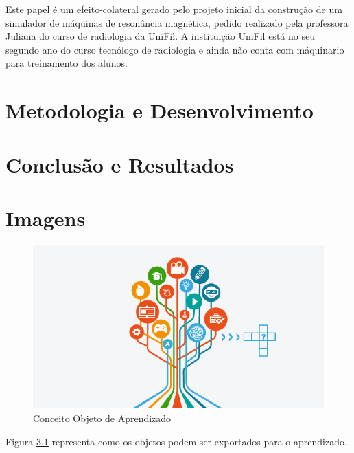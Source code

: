 \documentclass[12pt,openright,oneside,a4paper,english,french,spanish,brazil]{unifil}
\begin{document}
Este papel é um efeito-colateral gerado pelo projeto inicial da construção de um simulador de máquinas de resonância magnética, pedido realizado pela professora Juliana do curso de radiologia da UniFil. A instituição UniFil está no seu segundo ano do curso tecnólogo de radiologia e ainda não conta com máquinario para treinamento dos alunos.

\chapter {Metodologia e Desenvolvimento}

\chapter {Conclusão e Resultados}

\chapter {Imagens}
\begin{figure}[htb]
	\centering
	\includegraphics[scale=0.5]{arvore.png}
	\caption{Conceito Objeto de Aprendizado}
	\label{img:arvore}
\end{figure}
Figura \ref{img:arvore} representa como os objetos podem ser exportados para o aprendizado.


\cleardoublepage

\postextual

\end{document}
